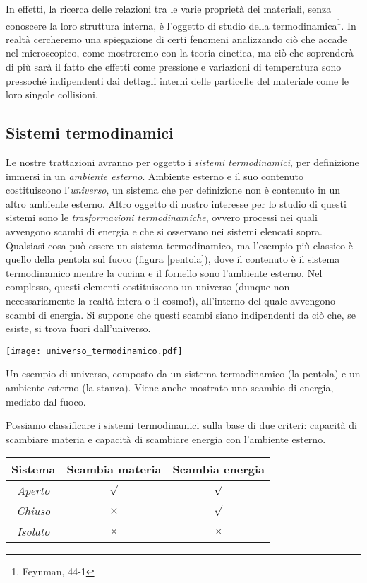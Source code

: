 In effetti, la ricerca delle relazioni tra le varie proprietà
dei materiali, senza conoscere la loro struttura interna, è l'oggetto
di studio della termodinamica\footnote{Feynman, 44-1}. In realtà cercheremo una spiegazione di certi fenomeni
analizzando ciò che accade nel microscopico, come mostreremo con la
teoria cinetica, ma ciò che soprenderà di più sarà il fatto che effetti
come pressione e variazioni di temperatura sono pressoché indipendenti
dai dettagli interni delle particelle del materiale come le loro singole
collisioni.

\subsection{Sistemi termodinamici}
Le nostre trattazioni avranno per oggetto i \textit{sistemi termodinamici}, per
definizione immersi in un \textit{ambiente esterno}. Ambiente esterno e il suo
contenuto costituiscono l'\textit{universo}, un sistema che per definizione non
è contenuto in un altro ambiente esterno.
Altro oggetto di nostro interesse per lo studio di questi sistemi sono le
\textit{trasformazioni termodinamiche}, ovvero processi nei quali avvengono
scambi di energia e che si osservano nei sistemi elencati sopra. Qualsiasi
cosa può essere un sistema termodinamico, ma l'esempio più classico è quello
della pentola sul fuoco (figura \ref{pentola}), dove il contenuto è il sistema termodinamico mentre
la cucina e il fornello sono l'ambiente esterno. Nel complesso, questi
elementi costituiscono un universo (dunque non necessariamente la
realtà intera o il cosmo!), all'interno del quale avvengono scambi di
energia. Si suppone che questi scambi siano indipendenti da ciò che, se esiste,
si trova fuori dall'universo.

\begin{marginfigure}
    \centering
    \texttt{[image: universo\_termodinamico.pdf]}
    \caption{Un esempio di universo, composto da un sistema termodinamico
    (la pentola) e un ambiente esterno (la stanza). Viene anche mostrato uno
    scambio di energia, mediato dal fuoco.}
    \label{pentola}
\end{marginfigure}


Possiamo classificare i sistemi termodinamici sulla base di due criteri: capacità
di scambiare materia e capacità di scambiare energia con l'ambiente esterno.

\begin{center}
    \begin{tabular}{c | c | c}
        Sistema & Scambia materia & Scambia energia \\
        \hline
        \hline
        \textit{Aperto} & $\surd$ & $\surd$ \\
        \hline
        \textit{Chiuso} & $\times$ & $\surd$ \\
        \hline
        \textit{Isolato} & $\times$ & $\times$
    \end{tabular}
\end{center}

